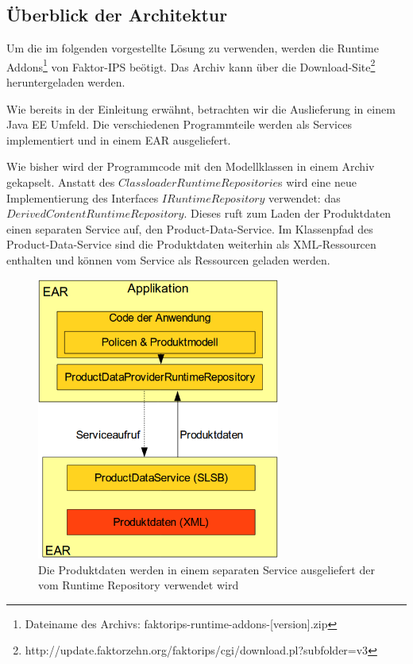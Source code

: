 \documentclass[headsepline=true, footsepline=true]{scrartcl}
\begin{document}
\subsection{Überblick der Architektur}

Um die im folgenden vorgestellte Lösung zu verwenden, werden
die Runtime Addons\footnote{Dateiname des Archivs:
faktorips-runtime-addons-[version].zip} von Faktor-IPS beötigt. Das Archiv kann
über die Download-Site\footnote{http://update.faktorzehn.org/faktorips/cgi/download.pl?subfolder=v3} heruntergeladen werden.

Wie bereits in der Einleitung erwähnt, betrachten wir die Auslieferung in einem
Java EE Umfeld. Die verschiedenen Programmteile werden als Services implementiert
und in einem EAR ausgeliefert.

Wie bisher wird der Programmcode mit den Modellklassen in einem Archiv gekapselt.
Anstatt des $ClassloaderRuntimeRepositorie$s wird eine neue Implementierung des
Interfaces $IRuntimeRepository$ verwendet: das
$DerivedContentRuntimeRepository$. Dieses ruft zum Laden der Produktdaten einen separaten Service auf, den
Product-Data-Service. Im Klassenpfad des Product-Data-Service sind die
Produktdaten weiterhin als XML-Ressourcen enthalten und können vom Service als
Ressourcen geladen werden.

\begin{figure}[htb] \centering
\includegraphics[width=8cm]{./pics/service_architecture.png} \caption{Die
Produktdaten werden in einem separaten Service ausgeliefert der vom Runtime
Repository verwendet wird}
\label{service_architecture}
\end{figure}
\end{document}
